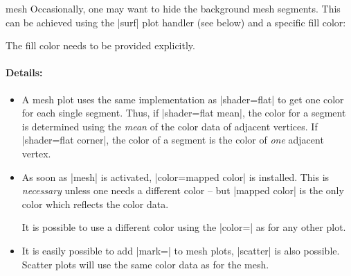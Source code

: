 {\begin{plottype}[/pgfplots]{mesh}
	Occasionally, one may want to hide the background mesh segments. This can be achieved using the |surf| plot handler (see below) and a specific fill color:
\pgfplotsexpensiveexample
\begin{codeexample}[]
\end{codeexample}
	The fill color needs to be provided explicitly.

	\paragraph{Details:}
	\begin{itemize}
		\item 
	A mesh plot uses the same implementation as |shader=flat| to get one color for each single segment. Thus, if |shader=flat mean|, the color for a segment is determined using the \emph{mean} of the color data of adjacent vertices. If |shader=flat corner|, the color of a segment is the color of \emph{one} adjacent vertex.
		\item As soon as |mesh| is activated, |color=mapped color| is installed. This is \emph{necessary} unless one needs a different color -- but |mapped color| is the only color which reflects the color data.

		It is possible to use a different color using the |color=| as for any other plot.

		\item It is easily possible to add |mark=| to mesh plots, |scatter| is also possible. Scatter plots will use the same color data as for the mesh.
	\end{itemize}

\pgfplotsexpensiveexample
\begin{codeexample}[]
\end{codeexample}
	

\end{plottype}}
